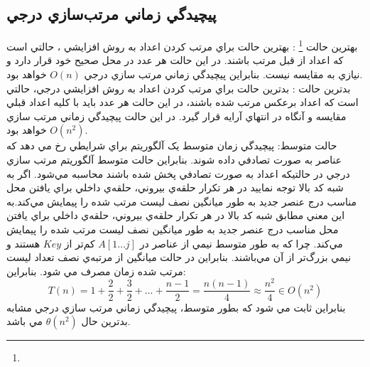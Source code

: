 \documentclass{book}
\begin{document}
	\subsection*{پيچيدگي زماني مرتب‌سازي درجي}
	بهترين حالت
	\footnote{}
	 : بهترين حالت براي مرتب کردن اعداد به روش افزايشي ، حالتي است که اعداد از قبل مرتب باشند. در اين حالت هر عدد در محل صحيح خود قرار دارد و نيازي به مقايسه نيست. بنابراين پيچيدگي زماني مرتب سازي درجي $O(n)$ خواهد بود.\\
	 
	 بدترين حالت :  بدترين حالت براي مرتب کردن اعداد به روش افزايشي درجي، حالتي است که اعداد برعکس مرتب شده باشند، در اين حالت هر عدد بايد با کليه اعداد قبلي مقايسه و آنگاه در انتهاي آرايه قرار گيرد. در اين حالت پيچيدگي زماني مرتب سازي $O(n^2)$ خواهد بود.\\
	 
	 حالت متوسط: پيچيدگي زمان متوسط يک آلگوريتم براي شرايطي رخ مي دهد که عناصر به صورت تصادفي داده شوند. بنابراين حالت متوسط آلگوريتم مرتب سازي درجي در حالتيکه اعداد به صورت تصادفي پخش شده باشند محاسبه مي‌شود.  اگر به شبه کد بالا توجه نماييد در هر تکرار حلقه‌ي بيروني، حلقه‌ي داخلي براي يافتن محل مناسب درج عنصر جديد به طور ميانگين نصف ليست مرتب شده را پيمايش مي‌کند.به اين معني مطابق شبه کد بالا در هر تکرار حلقه‌ي بيروني، حلقه‌ي داخلي براي يافتن محل مناسب درج عنصر جديد به طور ميانگين نصف ليست مرتب شده را پيمايش مي‌کند. چرا که به طور متوسط نيمي از عناصر در $A[1\dots j]$
کم‌تر از $Key$  هستند و نيمي بزرگ‌تر از آن مي‌باشند. بنابراين در حالت ميانگين از مرتبه‌ي نصف تعداد ليست مرتب شده زمان مصرف مي شود. بنابراين:\\
	 $$T(n)= 1+ \frac{2}{2} + \frac{3}{2} + \dots + \frac{n-1}{2} = \frac{n(n-1)}{4} \approx \frac{n^{2}}{4} \in O(n^{2})$$
	    بنابراين ثابت مي شود که بطور متوسط، پيچيدگي زماني مرتب سازي درجي مشابه بدترين حال
	   $ \theta (n^{2})$
	    مي باشد. 
\end{document}
